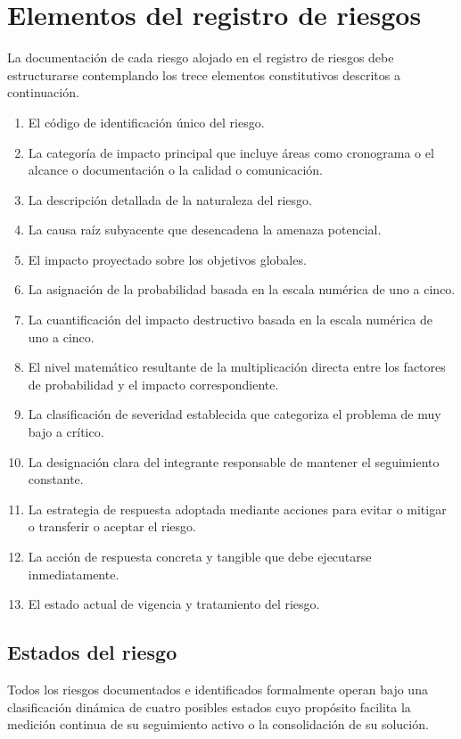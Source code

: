 \documentclass[11pt,spanish]{article}
\begin{document}
\section{Elementos del registro de riesgos}

La documentación de cada riesgo alojado en el registro de riesgos debe estructurarse contemplando los trece elementos constitutivos descritos a continuación.

\begin{enumerate}
    \item El código de identificación único del riesgo.
    \item La categoría de impacto principal que incluye áreas como cronograma o el alcance o documentación o la calidad o comunicación.
    \item La descripción detallada de la naturaleza del riesgo.
    \item La causa raíz subyacente que desencadena la amenaza potencial.
    \item El impacto proyectado sobre los objetivos globales.
    \item La asignación de la probabilidad basada en la escala numérica de uno a cinco.
    \item La cuantificación del impacto destructivo basada en la escala numérica de uno a cinco.
    \item El nivel matemático resultante de la multiplicación directa entre los factores de probabilidad y el impacto correspondiente.
    \item La clasificación de severidad establecida que categoriza el problema de muy bajo a crítico.
    \item La designación clara del integrante responsable de mantener el seguimiento constante.
    \item La estrategia de respuesta adoptada mediante acciones para evitar o mitigar o transferir o aceptar el riesgo.
    \item La acción de respuesta concreta y tangible que debe ejecutarse inmediatamente.
    \item El estado actual de vigencia y tratamiento del riesgo.
\end{enumerate}

\subsection{Estados del riesgo}

Todos los riesgos documentados e identificados formalmente operan bajo una clasificación dinámica de cuatro posibles estados cuyo propósito facilita la medición continua de su seguimiento activo o la consolidación de su solución.
\end{document}
